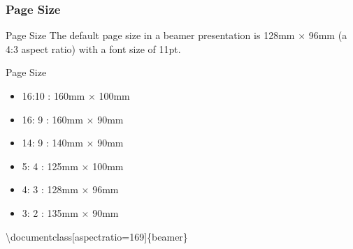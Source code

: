 \documentclass[ aspectratio=169,  10pt,blue,xcolor=pdftex,dvipsnames,table,handout,notes]{beamer}
\begin{document}
		\begin{frame}[t]
		\frametitle{Page Size}

			\begin{block} {Page Size}
			The default page size 
			in a beamer presentation is 128mm $\times$ 96mm (a 4:3 aspect ratio) 
			with a font size of 11pt.
			\end{block}


			\begin{block}{Page Size}
			\begin{itemize}
			\item 16:10 : 160mm $\times$ 100mm
			\item 16: 9 : 160mm $\times$ 90mm
			\item 14: 9 : 140mm $\times$ 90mm
			\item  5: 4 : 125mm $\times$ 100mm
			\item  4: 3 : 128mm $\times$ 96mm
			\item  3: 2 : 135mm $\times$ 90mm
			\end{itemize}
			\end{block}


		

			\textbackslash documentclass[aspectratio=169]\{beamer\}



		\end{frame}

\end{document}
